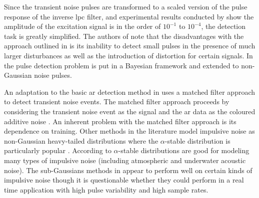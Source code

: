 Since the transient noise pulses are transformed to a scaled version of the pulse response of the inverse \gls{lpc} filter, and experimental results conducted by \cite{Vaseghi1990} show the amplitude of the excitation signal is in the order of $10^{-1}$ to $10^{-4}$, the detection task is greatly simplified. The authors of \cite{Godsill1998} note that the disadvantages with the approach outlined in \cite{Vaseghi1990} is its inability to detect small pulses in the presence of much larger disturbances as well as the introduction of distortion for certain signals. In \cite{Godsill1998} the pulse detection problem is put in a Bayesian framework and extended to non-Gaussian noise pulses.

An adaptation to the basic \gls{ar} detection method in \cite{Vaseghi1988} uses a matched filter approach to detect transient noise events. The matched filter approach proceeds by considering the transient noise event as the signal and the \gls{ar} data as the coloured additive noise \cite{Godsill1998book}. An inherent problem with the matched filter approach is its dependence on training. Other methods in the literature model impulsive noise as non-Gaussian heavy-tailed distributions where the $\alpha$-stable distribution is particularly popular \cite{Tsihrintzis1997}\cite{Coates2002}. According to \cite{Nikias1995} $\alpha$-stable distributions are good for modeling many types of impulsive noise (including atmospheric and underwater acoustic noise). The sub-Gaussians methods in \cite{Tsihrintzis1997}\cite{Coates2002} appear to perform well on certain kinds of impulsive noise though it is questionable whether they could perform in a real time application with high pulse variability and high sample rates.


